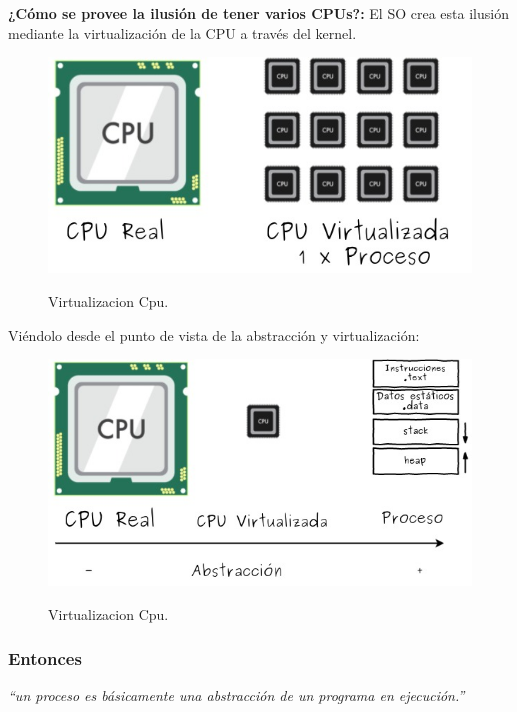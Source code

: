 \documentclass[../main.tex]{subfiles}
\begin{document}
            \textbf{¿Cómo se provee la ilusión de tener varios CPUs?:} El SO crea esta ilusión mediante la virtualización de la CPU a través del kernel.

            \begin{figure}[ht]
                \centering
                \includegraphics[scale=0.4]{../images/virtualizacionCpu.jpg}
                \label{fig:virtualizacionCpu}
                \caption{Virtualizacion Cpu.}
            \end{figure}

            Viéndolo desde el punto de vista de la abstracción y virtualización:

            \begin{figure}[ht]
                \centering
                \includegraphics[scale=0.4]{../images/cpuvirtualizacion.jpg}
                \label{fig:cpuvirtualizacion}
                \caption{Virtualizacion Cpu.}
            \end{figure}

        \subsubsection*{Entonces}
            \textit{“un proceso es básicamente una abstracción de un programa en ejecución.”}\\
\end{document}
